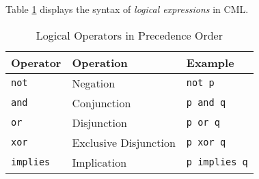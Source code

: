 Table \ref{tab:logical-expr-examples} displays the syntax of
\emph{logical expressions} in CML.

\begin{table}[H]
\centering
\begin{tabular}
{ l l l }
\hline
Operator & Operation & Example \\
\hline
\verb!not! & Negation & \verb!not p! \\
\verb!and! & Conjunction & \verb!p and q! \\
\verb!or! & Disjunction & \verb!p or q! \\
\verb!xor! & Exclusive Disjunction & \verb!p xor q! \\
\verb!implies! & Implication & \verb!p implies q! \\
\end{tabular}
\caption{Logical Operators in Precedence Order}
\label{tab:logical-expr-examples}
\end{table}
